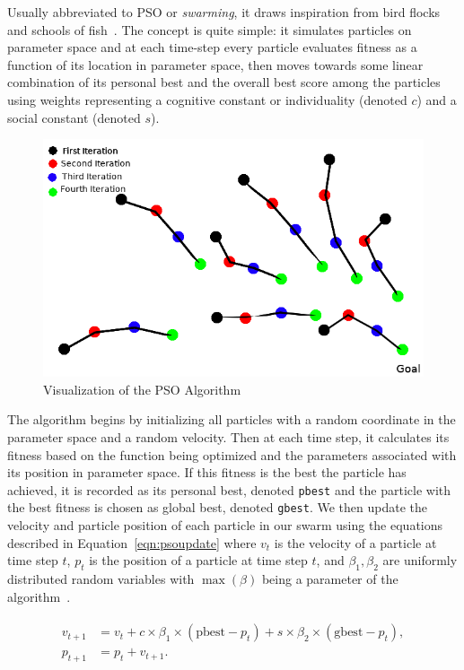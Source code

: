\documentclass[oneside,12pt,openany]{book}
\begin{document}
	Usually abbreviated to PSO or \textit{swarming}, it draws inspiration from bird flocks and schools of fish~\cite{Eberhart}. The concept is quite simple: it simulates particles on parameter space and at each time-step every particle evaluates fitness as a function of its location in parameter space, then moves towards some linear combination of its personal best and the overall best score among the particles using weights representing a cognitive constant or individuality (denoted $c$) and a social constant (denoted $s$).
	
	\begin{figure}[h!]
		\centering
		\includegraphics[width=.7\linewidth]{images/PSOVisual.png}
		\caption{Visualization of the PSO Algorithm}
		\label{fig:PSOVisual}
	\end{figure}
	
	The algorithm begins by initializing all particles with a random coordinate in the parameter space and a random velocity. Then at each time step, it calculates its fitness based on the function being optimized and the parameters associated with its position in parameter space. If this fitness is the best the particle has achieved, it is recorded as its personal best, denoted \texttt{pbest} and the particle with the best fitness is chosen as global best, denoted \texttt{gbest}. We then update the velocity and particle position of each particle in our swarm using the equations described in Equation~\eqref{eqn:psoupdate} where $v_{t}$ is the velocity of a particle at time step $t$, $p_{t}$ is the position of a particle at time step $t$, and $\beta_{1}, \beta_{2}$ are uniformly distributed random variables with $\max(\beta)$ being a parameter of the algorithm~\cite{PSOReview}.
	
	\begin{align}
	\label{eqn:psoupdate}
	\begin{split}
	v_{t+1} &= v_{t}+c\times \beta_{1} \times (\text{pbest}-p_{t})+s\times \beta_{2} \times (\text{gbest}-p_{t}), \\
	p_{t+1} &= p_{t} + v_{t+1} .
	\end{split}
	\end{align}
	
\end{document}
